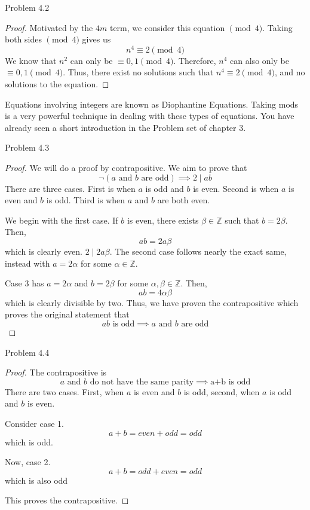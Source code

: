 \begin{sol}{Problem 4.2}
\begin{proof}
Motivated by the $4m$ term, we consider this equation $\pmod{4}$. Taking both sides $\pmod{4}$ gives us
\[
n^4 \equiv 2 \pmod{4}
\]
We know that $n^2$ can only be $\equiv 0, 1 \pmod{4}$. Therefore, $n^4$ can also only be $\equiv 0, 1 \pmod{4}$. Thus, there exist no solutions such that $n^4 \equiv 2 \pmod{4}$, and no solutions to the equation.
\end{proof}
Equations involving integers are known as Diophantine Equations. Taking mods is a very powerful technique in dealing with these types of equations. You have already seen a short introduction in the Problem set of chapter 3. 
\end{sol}

\begin{sol}{Problem 4.3}
\begin{proof}
We will do a proof by contrapositive. We aim to prove that 
\[
\lnot(\text{$a$ and $b$ are odd}) \implies 2 \mid ab
\]
There are three cases. First is when $a$ is odd and $b$ is even. Second is when $a$ is even and $b$ is odd. Third is when $a$ and $b$ are both even. 

We begin with the first case. If $b$ is even, there exists $\beta \in \mathbb{Z}$ such that $b = 2\beta$. Then, 
\[
ab = 2a\beta
\]
which is clearly even. $2 \mid 2a\beta$. The second case follows nearly the exact same, instead with $a = 2\alpha$ for some $\alpha \in \mathbb{Z}$.

Case 3 has $a = 2\alpha$ and $b = 2\beta$ for some $\alpha, \beta \in \mathbb{Z}$. Then,
\[
ab = 4\alpha\beta
\]
which is clearly divisible by two. Thus, we have proven the contrapositive which proves the original statement that 
\[
\text{$ab$ is odd} \implies \text{$a$ and $b$ are odd}
\]
\end{proof}
\end{sol}

\begin{sol}{Problem 4.4}
\begin{proof}
The contrapositive is
\[
\text{$a$ and $b$ do not have the same parity} \implies \text{a+b is odd}
\]
There are two cases. First, when $a$ is even and $b$ is odd, second, when $a$ is odd and $b$ is even. 

Consider case 1. 
\[
a + b = even + odd = odd
\]
which is odd.

Now, case 2.
\[
a + b = odd + even = odd
\]
which is also odd

This proves the contrapositive.
\end{proof}
\end{sol}


